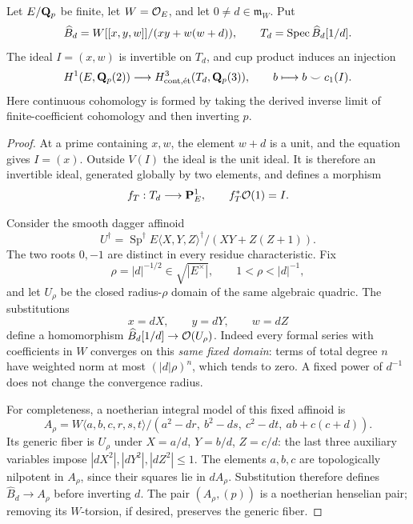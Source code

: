 \begin{lemma}\label{d3:lem:completedcup}
Let $E/\mathbf Q_p$ be finite, let $W=\mathcal O_E$, and let $0\ne d\in\mathfrak m_W$. Put
\[
\widehat B_d=W[[x,y,w]]/(xy+w(w+d)),\qquad
T_d=\operatorname{Spec}\widehat B_d[1/d].
\]
The ideal $I=(x,w)$ is invertible on $T_d$, and cup product induces an injection
\[
H^1(E,\mathbf Q_p(2))\longrightarrow
H^3_{\mathrm{cont},\mathrm{\acute et}}(T_d,\mathbf Q_p(3)),
\qquad b\longmapsto b\smile c_1(I).
\]
Here continuous cohomology is formed by taking the derived inverse limit of finite-coefficient cohomology and then inverting $p$.
\end{lemma}
\begin{proof}
At a prime containing $x,w$, the element $w+d$ is a unit, and the equation gives $I=(x)$. Outside $V(I)$ the ideal is the unit ideal. It is therefore an invertible ideal, generated globally by two elements, and defines a morphism
\[
f_T:T_d\longrightarrow\mathbf P^1_E,\qquad f_T^*\mathcal O(1)=I.
\]

Consider the smooth dagger affinoid
\[
U^\dagger=\operatorname{Sp}^\dagger
E\langle X,Y,Z\rangle^\dagger/(XY+Z(Z+1)).
\]
The two roots $0,-1$ are distinct in every residue characteristic. Fix
\[
\rho=|d|^{-1/2}\in\sqrt{|E^\times|},\qquad 1<\rho<|d|^{-1},
\]
and let $U_\rho$ be the closed radius-$\rho$ domain of the same algebraic quadric. The substitutions
\begin{equation}\label{d3:eq:fixedradius}
x=dX,\qquad y=dY,\qquad w=dZ
\end{equation}
define a homomorphism $\widehat B_d[1/d]\to\mathcal O(U_\rho)$. Indeed every formal series with coefficients in $W$ converges on this \emph{same fixed domain}: terms of total degree $n$ have weighted norm at most $(|d|\rho)^n$, which tends to zero. A fixed power of $d^{-1}$ does not change the convergence radius.

For completeness, a noetherian integral model of this fixed affinoid is
\[
 A_\rho=W\langle a,b,c,r,s,t\rangle/
 (a^2-dr,\ b^2-ds,\ c^2-dt,\ ab+c(c+d)).
\]
Its generic fiber is $U_\rho$ under $X=a/d$, $Y=b/d$, $Z=c/d$:
the last three auxiliary variables impose
$|dX^2|,|dY^2|,|dZ^2|\leq1$.
The elements $a,b,c$ are topologically nilpotent in $A_\rho$,
since their squares lie in $dA_\rho$. Substitution therefore defines
$\widehat B_d\to A_\rho$ before inverting $d$.
The pair $(A_\rho,(p))$ is a noetherian henselian pair; removing its
$W$-torsion, if desired, preserves the generic fiber.


\end{proof}
